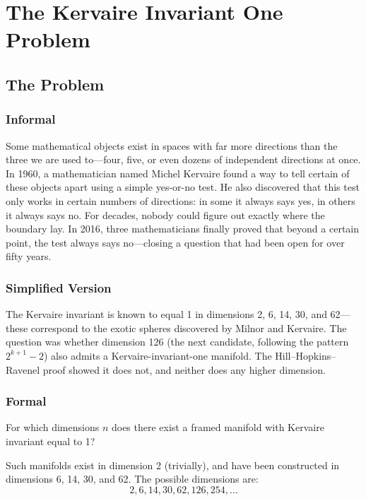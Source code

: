 \let\LocalMacro\relax

\chapter{The Kervaire Invariant One Problem}

\section{The Problem}

\subsection{Informal}
Some mathematical objects exist in spaces with far more directions than the three we are used to---four, five, or even dozens of independent directions at once. In 1960, a mathematician named Michel Kervaire found a way to tell certain of these objects apart using a simple yes-or-no test. He also discovered that this test only works in certain numbers of directions: in some it always says yes, in others it always says no. For decades, nobody could figure out exactly where the boundary lay. In 2016, three mathematicians finally proved that beyond a certain point, the test always says no---closing a question that had been open for over fifty years.

\subsection{Simplified Version}
The Kervaire invariant is known to equal 1 in dimensions 2, 6, 14, 30, and 62---these correspond to the exotic spheres discovered by Milnor and Kervaire. The question was whether dimension 126 (the next candidate, following the pattern $2^{k+1}-2$) also admits a Kervaire-invariant-one manifold. The Hill--Hopkins--Ravenel proof showed it does not, and neither does any higher dimension.

\subsection{Formal}
For which dimensions $n$ does there exist a framed manifold with Kervaire invariant equal to 1?

Such manifolds exist in dimension 2 (trivially), and have been constructed in dimensions 6, 14, 30, and 62. The possible dimensions are:
\[2, 6, 14, 30, 62, 126, 254, \ldots\]

